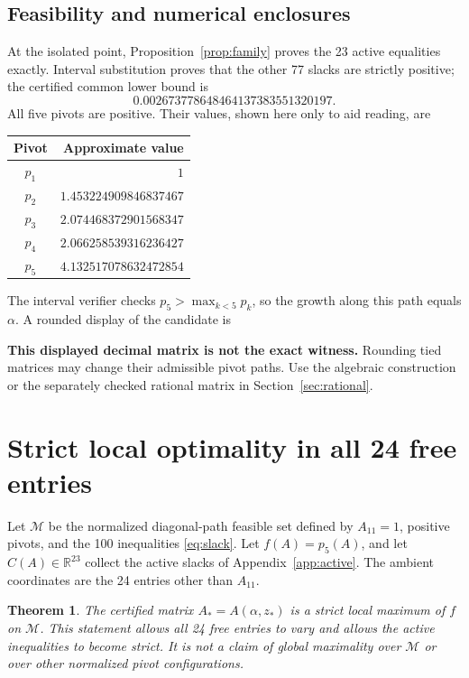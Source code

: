 \documentclass[11pt,letterpaper]{article}
\newtheorem{theorem}{Theorem}[section]
\newcommand{\R}{\mathbb R}\newcommand{\Q}{\mathbb Q}
\begin{document}
\subsection{Feasibility and numerical enclosures}
At the isolated point, Proposition~\ref{prop:family} proves the 23 active equalities exactly. Interval substitution proves that the other 77 slacks are strictly positive; the certified common lower bound is
\[
              0.002673778648464137383551320197.
\]
All five pivots are positive. Their values, shown here only to aid reading, are
\begin{center}
\begin{tabular}{@{}cr@{}}\toprule
Pivot & Approximate value\\\midrule
$ p_1 $ & $1$\\
$ p_2 $ & $1.453224909846837467$\\
$ p_3 $ & $2.074468372901568347$\\
$ p_4 $ & $2.066258539316236427$\\
$ p_5 $ & $4.132517078632472854$\\\bottomrule
\end{tabular}
\end{center}
The interval verifier checks $p_5>\max_{k<5}p_k$, so the growth along this path equals $\alpha$. A rounded display of the candidate is

\textbf{This displayed decimal matrix is not the exact witness.} Rounding tied matrices may change their admissible pivot paths. Use the algebraic construction or the separately checked rational matrix in Section~\ref{sec:rational}.

\section{Strict local optimality in all 24 free entries}\label{sec:local}
Let $\mathcal M$ be the normalized diagonal-path feasible set defined by $A_{11}=1$, positive pivots, and the 100 inequalities \eqref{eq:slack}. Let $f(A)=p_5(A)$, and let $C(A)\in\R^{23}$ collect the active slacks of Appendix~\ref{app:active}. The ambient coordinates are the 24 entries other than $A_{11}$.

\begin{theorem}\label{thm:local}
The certified matrix $A_* = A(\alpha,z_*)$ is a strict local maximum of $f$ on $\mathcal M$. This statement allows all 24 free entries to vary and allows the active inequalities to become strict. It is not a claim of global maximality over $\mathcal M$ or over other normalized pivot configurations.
\end{theorem}
\end{document}
